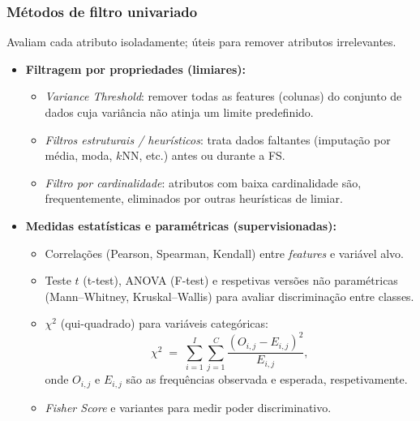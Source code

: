 \subsubsection*{Métodos de filtro univariado}
Avaliam cada atributo isoladamente; úteis para remover atributos irrelevantes.
\begin{itemize}
    \item \textbf{Filtragem por propriedades (limiares):}
    \begin{itemize}
        \item \emph{Variance Threshold}: remover todas as features (colunas) do conjunto de dados cuja variância não atinja um limite predefinido. \cite{Theng2024}
        \item \emph{Filtros estruturais / heurísticos}: trata dados faltantes (imputação por média, moda, $k$NN, etc.) antes ou durante a FS. \cite{ergul2024filter}
        \item \emph{Filtro por cardinalidade}: atributos com baixa cardinalidade são, frequentemente, eliminados por outras heurísticas de limiar. \cite{somol2010evaluating}
    \end{itemize}

    \item \textbf{Medidas estatísticas e paramétricas (supervisionadas):}
    \begin{itemize}
        \item Correlações (Pearson, Spearman, Kendall) entre \emph{features} e variável alvo. \cite{Theng2024,EBRAHIMIWARKIANI2025129372,Dhal2022}
        \item Teste $t$ (t-test), ANOVA (F-test) e respetivas versões não paramétricas (Mann–Whitney, Kruskal–Wallis) para avaliar discriminação entre classes. \cite{Theng2024,Emmoh2024,BARBIERI2024123667}
        \item \(\chi^2\) (qui-quadrado) para variáveis categóricas:
        \begin{equation}
            \chi^2 \;=\; \sum_{i=1}^{I}\sum_{j=1}^{C} \frac{(O_{i,j}-E_{i,j})^2}{E_{i,j}},
        \end{equation}
        onde \(O_{i,j}\) e \(E_{i,j}\) são as frequências observada e esperada, respetivamente. \cite{Dhal2022}
        \item \emph{Fisher Score} e variantes para medir poder discriminativo. \cite{Theng2024}
    \end{itemize}


\end{itemize}
